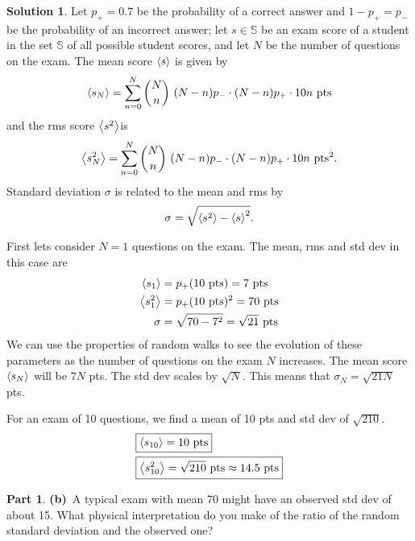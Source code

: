 \documentclass[11pt]{article}
\theoremstyle{definition}
\newtheorem{question}{Part}[section]
\newtheorem*{solution}{Solution}
\numberwithin{equation}{section}
\numberwithin{figure}{section}
\begin{document}
\begin{solution}
Let $p_+ = 0.7$ be the probability of a correct answer and $1 - p_+ = p_-$ be the probability of an incorrect answer; let $s \in \mathbb{S}$ be an exam score of a student in the set $\mathbb{S}$ of all possible student scores, and let $N$ be the number of questions on the exam. The mean score $\expval{s}$ is given by
\begin{equation}
\expval{s_N} = \sum_{n = 0}^N \binom{N}{n} \ (N-n)p_-\cdot(N-n)p_+\cdot10n \ \text{pts}
\end{equation}
and the rms score $\expval{s^2}$is
\begin{equation}
\expval{s_N^2} = \sum_{n = 0}^N \binom{N}{n} \ (N-n)p_-\cdot(N-n)p_+\cdot10n \ \text{pts}^2.
\end{equation}
Standard deviation $\sigma$ is related to the mean and rms by
\begin{equation}
\sigma = \sqrt{\expval{s^2} - \expval{s}^2}.
\end{equation}

First lets consider $N = 1$ questions on the exam. The mean, rms and std dev in this case are
\begin{align}
\expval{s_1} &= p_+(10 \ \text{pts}) = 7 \ \text{pts}
\\
\expval{s_1^2} &= p_+(10 \ \text{pts})^2 = 70 \ \text{pts}
\\
\sigma &= \sqrt{70 - 7^2} = \sqrt{21} \ \text{pts}
\end{align}
We can use the properties of random walks to see the evolution of these parameters as the number of questions on the exam $N$ increases. The mean score $\expval{s_N}$ will be $7N$ pts. The std dev scales by $\sqrt{N}$. This means that $\sigma_N = \sqrt{21N}$ pts.

For an exam of 10 questions, we find a mean of 10 pts and std dev of $\sqrt{210}$.
\begin{align}
\Aboxed{\expval{s_{10}} &= 10 \ \text{pts}}
\\
\Aboxed{\expval{s_{10}^2} &= \sqrt{210} \ \text{pts} \approx 14.5 \ \text{pts}}
\end{align}
\end{solution}


\newpage
\begin{question}
\textbf{(b)}~A typical exam with mean 70 might have an observed std dev of about 15. What physical interpretation do you make of the ratio of the random standard deviation and the observed one?
\end{question}
\end{document}
